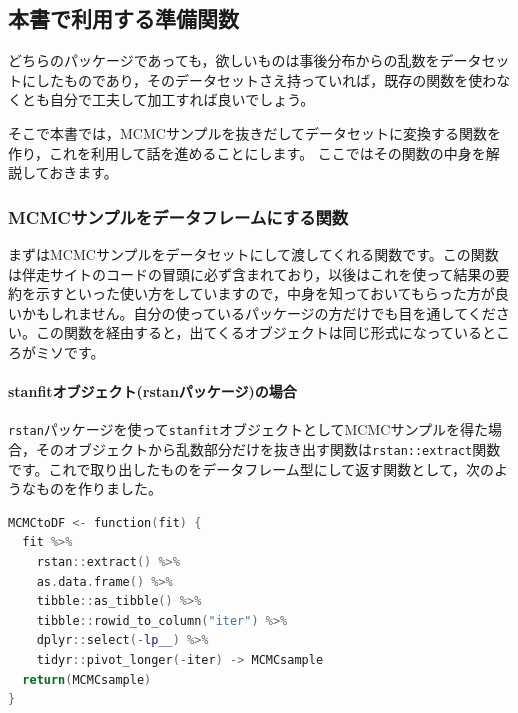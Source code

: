 \documentclass{ltjsbook}
\begin{document}
\subsection{本書で利用する準備関数}
\label{preparedFunctions}
どちらのパッケージであっても，欲しいものは事後分布からの乱数をデータセットにしたものであり，そのデータセットさえ持っていれば，既存の関数を使わなくとも自分で工夫して加工すれば良いでしょう。

そこで本書では，MCMCサンプルを抜きだしてデータセットに変換する関数を作り，これを利用して話を進めることにします。
ここではその関数の中身を解説しておきます。
\subsubsection{MCMCサンプルをデータフレームにする関数}
まずはMCMCサンプルをデータセットにして渡してくれる関数です。この関数は伴走サイトのコードの冒頭に必ず含まれており，以後はこれを使って結果の要約を示すといった使い方をしていますので，中身を知っておいてもらった方が良いかもしれません。自分の使っているパッケージの方だけでも目を通してください。この関数を経由すると，出てくるオブジェクトは同じ形式になっているところがミソです。

\paragraph{stanfitオブジェクト(rstanパッケージ)の場合}
\verb|rstan|パッケージを使って\verb|stanfit|オブジェクトとしてMCMCサンプルを得た場合，そのオブジェクトから乱数部分だけを抜き出す関数は\verb|rstan::extract|関数です。これで取り出したものをデータフレーム型にして返す関数として，次のようなものを作りました。

\begin{lstlisting}[language=C++,label={code:PRE_05MCMC2dfRSTAN},caption={MCMCtoDF関数(rstan版)}]
MCMCtoDF <- function(fit) {
  fit %>%
    rstan::extract() %>%
    as.data.frame() %>%
    tibble::as_tibble() %>%
    tibble::rowid_to_column("iter") %>%
    dplyr::select(-lp__) %>%
    tidyr::pivot_longer(-iter) -> MCMCsample
  return(MCMCsample)
}
\end{lstlisting}
\end{document}
